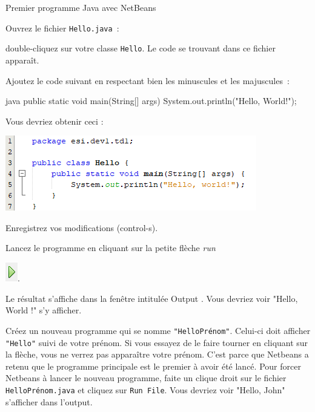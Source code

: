 \documentclass[a4paper,11pt]{article}
\begin{document}
\begin{Tutoriel}{Premier programme Java avec NetBeans}
\begin{steps}
		\item Ouvrez le fichier \texttt{Hello.java}~:
		
			double-cliquez sur votre classe \texttt{Hello}. 
			Le code se trouvant dans ce fichier apparaît.
			
%			
%			
			
			Ajoutez le code suivant en respectant bien les 
			minuscules et les majuscules~:
	
			\begin{Code}{java}
				public static void main(String[] args) {
					System.out.println("Hello, World!");
				}
			\end{Code}
			
			Vous devriez obtenir ceci :
			
			\begin{center}
				\includegraphics{images/nb_newproject_code}
			\end{center}
			Enregistrez vos modifications (control-s).
			
		\item Lancez le programme en cliquant sur la petite flèche \emph{run} 
			
			\includegraphics{images/nb_newproject_run}.
			
			Le résultat s'affiche dans la fenêtre intitulée \og Output \fg.
			Vous devriez voir "Hello, World !" s'y afficher.

		\item Créez un nouveau programme qui se nomme \texttt{"HelloPrénom"}. Celui-ci doit afficher \texttt{"Hello"} suivi de votre prénom.
		Si vous essayez de le faire tourner en cliquant sur la flèche, vous ne verrez pas apparaître votre prénom. C'est parce que Netbeans a retenu que le programme principale est le premier à avoir été lancé. Pour forcer Netbeans à lancer le nouveau programme, faite un clique droit sur le fichier \texttt{HelloPrénom.java} et cliquez sur \texttt{Run File}. Vous devriez voir "Hello, John" s'afficher dans l'output.


\end{steps}
\end{Tutoriel}
\end{document}
